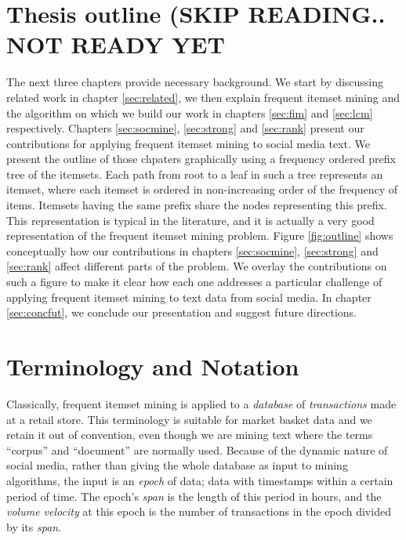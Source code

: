 \documentclass[letterpaper,12pt,titlepage,oneside,final]{book}
\begin{document}
\section{Thesis outline (SKIP READING.. NOT READY YET}

The next three chapters provide necessary background.
We start by discussing related work in chapter \ref{sec:related},
we then explain frequent itemset mining and the algorithm on which we build
our work in chapters \ref{sec:fim} and \ref{sec:lcm} respectively.
Chapters \ref{sec:socmine}, \ref{sec:strong} and \ref{sec:rank} present
our contributions for applying frequent
itemset mining to social media text.
We present the outline of those chpaters graphically using a
frequency ordered prefix tree of the itemsets.
Each path from root to a leaf in such a tree represents an itemset,
where each itemset is ordered in non-increasing order of the frequency of
items.
Itemsets having the same prefix share the nodes representing this prefix.
This representation is typical in the literature, and it is actually a very
good representation of the frequent itemset mining problem.
Figure \ref{fig:outline} shows conceptually how our contributions in chapters  \ref{sec:socmine},
\ref{sec:strong} and \ref{sec:rank}  affect different parts of the
problem. We overlay the contributions on such a figure to make it clear how each one addresses a particular challenge of applying frequent itemset mining to text data from social media. In chapter \ref{sec:concfut}, we conclude our presentation and
suggest future directions.


\section{Terminology and Notation}
Classically, frequent itemset mining is applied to a \emph{database} of
\emph{transactions} made at a retail store.
This terminology is suitable for market basket data and we retain it out of
convention, even though we are mining text where the terms ``corpus'' and
``document'' are normally used.
Because of the dynamic nature of social media, rather than giving the whole
database as input to mining algorithms, the input is an \emph{epoch} of data;
data with timestamps within a certain period of time.
The epoch's \emph{span} is the length of this period in hours,
and the \emph{volume velocity} at this epoch is the number of transactions in the epoch
divided by its \emph{span}.
\end{document}
